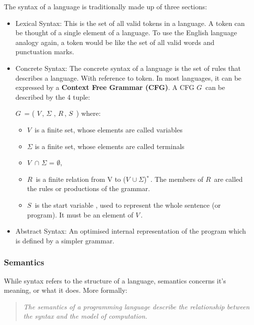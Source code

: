 \documentclass[ %
                    author={Jonathan Rankin},
                supervisor={Dr. David May, Dr. Ian Holyer},
                    degree={MEng},
                     title={CodeTouch},
                  subtitle={A Revolutionary Way To Program Real Code On Touch Screen Devices},
                      type={enterprise},
                      year={2015 } ]{dissertation}
\begin{document}
The syntax of a language is traditionally made up of three sections:
\begin{itemize}
\item {Lexical Syntax: }
This is the set of all valid tokens in a language. A token can be thought of a single element of a language. To use the English language analogy again, a token would be like the set of all valid words and punctuation marks. 

\item{Concrete Syntax: }
The concrete syntax of a language is the set of rules that describes a language. With reference to token. In most languages, it can be expressed by a \textbf{Context Free Grammar (CFG)}. A CFG $G\,$ can be described by the 4 tuple\cite{Sipser}:

$G\,$ = ( $V\,$, $\Sigma$ , $R\,$, $S\,$ ) where:

\begin{itemize}
\item
$V\,$  is a finite set, whose elements are called variables
\item
$\Sigma$ is a finite set, whose elements are called terminals
\item $V\,$ $\cap$ $\Sigma$ = $\emptyset$,
\item
$R\,$ is a finite relation from V to ($V\,\cup\Sigma$)$^{*}\,$. The members of $R\,$ are called the rules or productions of the grammar. 
\item
$S\,$ is the start variable , used to represent the whole sentence (or program). It must be an element of $V\,$.
\end{itemize}



\item{Abstract Syntax: }
An optimised internal representation of the program which is defined by a simpler grammar. 
\end{itemize}


\subsubsection{Semantics}
While syntax refers to the structure of a language, semantics concerns it's meaning, or what it does. More formally: 

\begin{quote}
\textit{The semantics of a programming language describe the relationship between the syntax and the model of computation\cite{semantics}.}
\end{quote}
\end{document}

